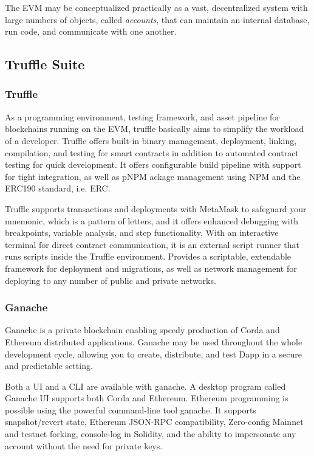 \vspace{.5cm}

The \ac{EVM} may be conceptualized practically as a vast, decentralized system with large numbers of objects, called \textit{accounts}, that can maintain an internal database, run code, and communicate with one another.

\subsection{Truffle Suite}
\subsubsection{Truffle}

As a programming environment, testing framework, and asset pipeline for blockchains running on the \ac{EVM}, truffle basically aims to simplify the workload of a developer. Truffle offers built-in binary management, deployment, linking, compilation, and testing for smart contracts in addition to automated contract testing for quick development. It offers configurable build pipeline with support for tight integration, as well as pNPM ackage management using \ac{NPM} and the ERC190 standard, i.e. \ac{ERC}.

\vspace{.5cm}

Truffle supports transactions and deployments with MetaMask to safeguard your mnemonic, which is a pattern of letters, and it offers enhanced debugging with breakpoints, variable analysis, and step functionality.
With an interactive terminal for direct contract communication, it is an external script runner that runs scripts inside the Truffle environment.
Provides a scriptable, extendable framework for deployment and migrations, as well as network management for deploying to any number of public and private networks.

\subsubsection{Ganache}

Ganache is a private blockchain enabling speedy production of Corda and Ethereum distributed applications. Ganache may be used throughout the whole development cycle, allowing you to create, distribute, and test \ac{Dapp} in a secure and predictable setting.

\vspace{.5cm}

Both a \ac{UI} and a \ac{CLI} are available with ganache. A desktop program called Ganache \ac{UI} supports both Corda and Ethereum. Ethereum programming is possible using the powerful command-line tool ganache. It supports snapshot/revert state, Ethereum JSON-RPC compatibility, Zero-config Mainnet and testnet forking, console-log in Solidity, and the ability to impersonate any account without the need for private keys.


